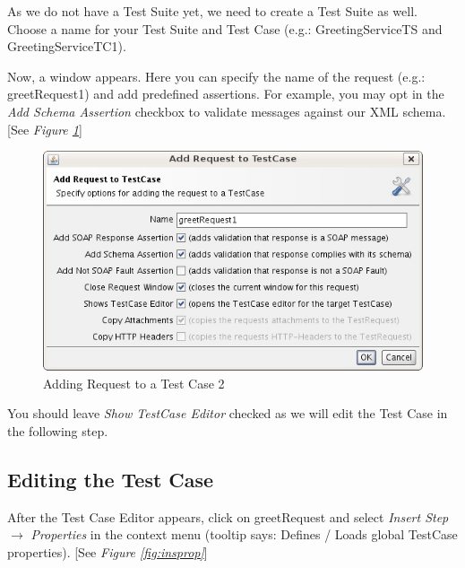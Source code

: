 \documentclass{article}
\begin{document}
As we do not have a Test Suite yet, we need to create a Test Suite as
well. Choose a name for your Test Suite and Test Case (e.g.:
GreetingServiceTS and GreetingServiceTC1).

Now, a window appears. Here you can specify the name of the request
(e.g.: greetRequest1) and add predefined assertions. For example, you
may opt in the \textit{Add Schema Assertion} checkbox to validate
messages against our XML schema. [See \emph{Figure \ref{fig:addreq2tc2}}]

\begin{figure}
\begin{center}
\includegraphics{fig/ARC1PythonDGDraft-img5.jpg}
\caption{Adding Request to a Test Case 2}
\label{fig:addreq2tc2}
\end{center}
\end{figure}

You should leave \textit{Show TestCase Editor} checked as we will
edit the Test Case in the following step.

\subsection{Editing the Test Case}
\label{sec:edittc}

After the Test Case Editor appears, click on greetRequest and select
\textit{Insert Step} $\to$ \textit{Properties} in the context menu
(tooltip says: Defines / Loads global TestCase properties). [See 
\emph{Figure \ref{fig:insprop}}]
\end{document}
